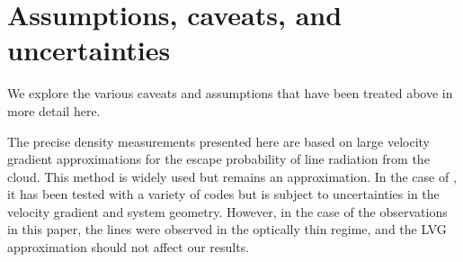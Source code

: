 % 
% 
% 

\appendix
\section{Assumptions, caveats, and uncertainties}
\label{sec:caveats}
We explore the various caveats and assumptions that have been treated above in
more detail here.

The precise density measurements presented here are based on large velocity
gradient approximations \citep{Sobolev1957a} for the escape probability of line
radiation from the cloud.  This method is widely used but remains an
approximation.  In the case of \formaldehyde, it has been tested with a variety
of codes \citep{van-der-Tak2007a,Henkel1983a} but is subject to uncertainties in
the velocity gradient and system geometry.  However, in the case of the
observations in this paper, the lines were observed in the optically thin regime, and the
LVG approximation should not affect our results.


